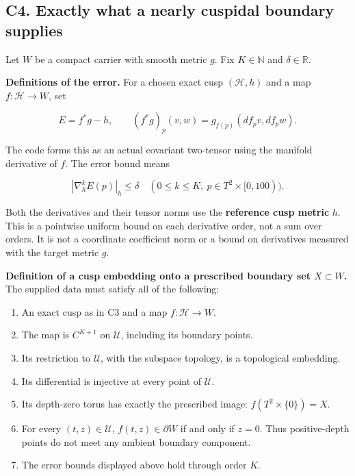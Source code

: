 \documentclass[
  letterpaper,
  11pt]{article}
\providecommand{\tightlist}{%
  \setlength{\itemsep}{0pt}\setlength{\parskip}{0pt}}
\begin{document}
\subsection{C4. Exactly what a nearly cuspidal boundary
supplies}\label{collapse-cuspembedding}

Let \(W\) be a compact carrier with smooth metric \(g\). Fix
\(K\in\mathbb N\) and \(\delta\in\mathbb R\).

\textbf{Definitions of the error.} For a chosen exact cusp
\((\mathcal H,h)\) and a map \(f:\mathcal H\to W\), set

\[
 E=f^*g-h,\qquad
 (f^*g)_p(v,w)=g_{f(p)}(df_pv,df_pw).
\]

The code forms this as an actual covariant two-tensor using the manifold
derivative of \(f\). The error bound means

\[
 |\nabla_h^k E(p)|_h\leq\delta
 \quad(0\leq k\leq K,\ p\in T^2\times[0,100)).
\]

Both the derivatives and their tensor norms use the \textbf{reference
cusp metric} \(h\). This is a pointwise uniform bound on each derivative
order, not a sum over orders. It is not a coordinate coefficient norm or
a bound on derivatives measured with the target metric \(g\).

\textbf{Definition of a cusp embedding onto a prescribed boundary set
\(X\subset W\).} The supplied data must satisfy all of the following:

\begin{enumerate}
\def\labelenumi{\arabic{enumi}.}
\tightlist
\item
  An exact cusp as in C3 and a map \(f:\mathcal H\to W\).
\item
  The map is \(C^{K+1}\) on \(\mathcal U\), including its boundary
  points.
\item
  Its restriction to \(\mathcal U\), with the subspace topology, is a
  topological embedding.
\item
  Its differential is injective at every point of \(\mathcal U\).
\item
  Its depth-zero torus has exactly the prescribed image:
  \(f(T^2\times\{0\})=X\).
\item
  For every \((t,z)\in\mathcal U\), \(f(t,z)\in\partial W\) if and only
  if \(z=0\). Thus positive-depth points do not meet any ambient
  boundary component.
\item
  The error bounds displayed above hold through order \(K\).
\end{enumerate}
\end{document}
